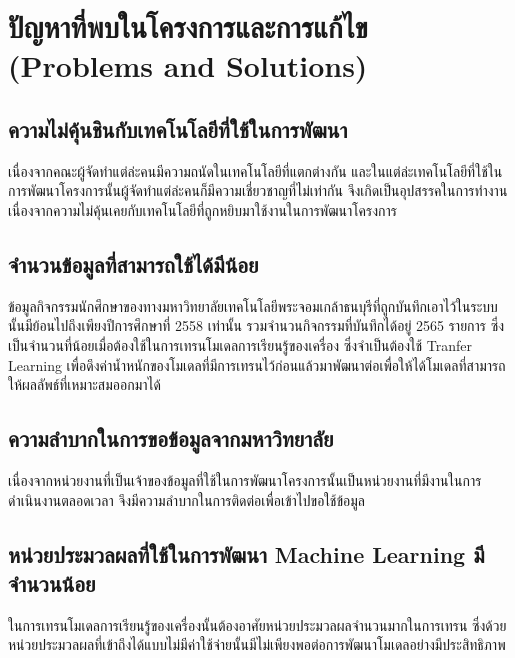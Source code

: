 \documentclass[14pt,oneside,openright,a4paper]{cpe-thai-project}
\begin{document}
\section{ปัญหาที่พบในโครงการและการแก้ไข (Problems and Solutions)}
\subsection{ความไม่คุ้นชินกับเทคโนโลยีที่ใช้ในการพัฒนา}
เนื่องจากคณะผู้จัดทำแต่ล่ะคนมีความถนัดในเทคโนโลยีที่แตกต่างกัน และในแต่ล่ะเทคโนโลยีที่ใช้ในการพัฒนาโครงการนั้นผู้จัดทำแต่ล่ะคนก็มีความเชี่ยวชาญที่ไม่เท่ากัน 
จึงเกิดเป็นอุปสรรคในการทำงานเนื่องจากความไม่คุ้นเคยกับเทคโนโลยีที่ถูกหยิบมาใช้งานในการพัฒนาโครงการ
\subsection{จำนวนข้อมูลที่สามารถใช้ได้มีน้อย}
ข้อมูลกิจกรรมนักศึกษาของทางมหาวิทยาลัยเทคโนโลยีพระจอมเกล้าธนบุรีที่ถูกบันทึกเอาไว้ในระบบนั้นมีย้อนไปถึงเพียงปีการศึกษาที่ 2558 เท่านั้น 
รวมจำนวนกิจกรรมที่บันทึกได้อยู่ 2565 รายการ ซึ่งเป็นจำนวนที่น้อยเมื่อต้องใช้ในการเทรนโมเดลการเรียนรู้ของเครื่อง ซึ่งจำเป็นต้องใช้ Tranfer Learning 
เพื่อดึงค่าน้ำหนักของโมเดลที่มีการเทรนไว้ก่อนแล้วมาพัฒนาต่อเพื่อให้ได้โมเดลที่สามารถให้ผลลัพธ์ที่เหมาะสมออกมาได้
\subsection{ความลำบากในการขอข้อมูลจากมหาวิทยาลัย}
เนื่องจากหน่วยงานที่เป็นเจ้าของข้อมูลที่ใช้ในการพัฒนาโครงการนั้นเป็นหน่วยงานที่มีงานในการดำเนินงานตลอดเวลา จึงมีความลำบากในการติดต่อเพื่อเข้าไปขอใช้ข้อมูล
\subsection{หน่วยประมวลผลที่ใช้ในการพัฒนา Machine Learning มีจำนวนน้อย}
ในการเทรนโมเดลการเรียนรู้ของเครื่องนั้นต้องอาศัยหน่วยประมวลผลจำนวนมากในการเทรน ซึ่งด้วยหน่วยประมวลผลที่เข้าถึงได้แบบไม่มีค่าใช้จ่ายนั้นมีไม่เพียงพอต่อการพัฒนาโมเดลอย่างมีประสิทธิภาพ
\end{document}

